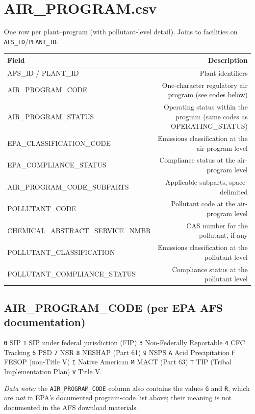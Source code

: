 \documentclass[11pt]{article}
\begin{document}
\section*{AIR\_PROGRAM.csv}
One row per plant--program (with pollutant-level detail). Joins to facilities on \texttt{AFS\_ID}/\texttt{PLANT\_ID}.
\begin{longtable}{F D}
\toprule
Field & Description \\ \midrule \endhead
AFS\_ID / PLANT\_ID & Plant identifiers \\
AIR\_PROGRAM\_CODE & One-character regulatory air program (see codes below) \\
AIR\_PROGRAM\_STATUS & Operating status within the program (same codes as OPERATING\_STATUS) \\
EPA\_CLASSIFICATION\_CODE & Emissions classification at the air-program level \\
EPA\_COMPLIANCE\_STATUS & Compliance status at the air-program level \\
AIR\_PROGRAM\_CODE\_SUBPARTS & Applicable subparts, space-delimited \\
POLLUTANT\_CODE & Pollutant code at the air-program level \\
CHEMICAL\_ABSTRACT\_SERVICE\_NMBR & CAS number for the pollutant, if any \\
POLLUTANT\_CLASSIFICATION & Emissions classification at the pollutant level \\
POLLUTANT\_COMPLIANCE\_STATUS & Compliance status at the pollutant level \\
\bottomrule
\end{longtable}

\subsection*{AIR\_PROGRAM\_CODE (per EPA AFS documentation)}
\texttt{0} SIP \textbar{} \texttt{1} SIP under federal jurisdiction (FIP) \textbar{}
\texttt{3} Non-Federally Reportable \textbar{} \texttt{4} CFC Tracking \textbar{} \texttt{6} PSD \textbar{}
\texttt{7} NSR \textbar{} \texttt{8} NESHAP (Part 61) \textbar{} \texttt{9} NSPS \textbar{}
\texttt{A} Acid Precipitation \textbar{} \texttt{F} FESOP (non-Title V) \textbar{}
\texttt{I} Native American \textbar{} \texttt{M} MACT (Part 63) \textbar{}
\texttt{T} TIP (Tribal Implementation Plan) \textbar{} \texttt{V} Title V.

\noindent\emph{Data note:} the \texttt{AIR\_PROGRAM\_CODE} column also contains the values \texttt{G} and
\texttt{R}, which are \emph{not} in EPA's documented program-code list above; their meaning is not
documented in the AFS download materials.
\end{document}
